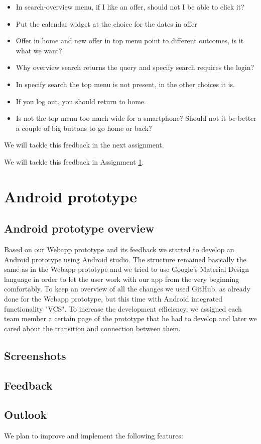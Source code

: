 \documentclass[11pt,twoside,a4paper]{report}
\begin{document}
\begin{itemize}

\item In search-overview menu, if I like an offer, should not I be able to click it?

\item Put the calendar widget at the choice for the dates in offer

\item Offer in home and new offer in top menu point to different outcomes, is it what we want?

\item Why overview search returns the query and specify search requires the login?

\item In specify search the top menu is not present, in the other choices it is.

\item If you log out, you should return to home.

\item Is not the top menu too much wide for a smartphone? Should not it be better a couple of big buttons to go home or back?

\end{itemize}

We will tackle this feedback in the next assignment.

We will tackle this feedback in Assignment \ref{assignment:android-prototype}.

\chapter{Android prototype}
\label{assignment:android-prototype}

\section{Android prototype overview}
Based on our Webapp prototype and its feedback we started to develop an Android prototype using Android studio. The structure remained basically the same as in the Webapp prototype and we tried to use Google’s Material Design language in order to let the user work with our app from the very beginning comfortably. To keep an overview of all the changes we used GitHub, as already done for the Webapp prototype, but this time with Android integrated functionality "VCS".
To increase the development efficiency, we assigned each team member a certain page of the prototype that he had to develop and later we cared about the transition and connection between them.


\section{Screenshots}

\section{Feedback}

\section{Outlook}

We plan to improve and implement the following features:
\end{document}

